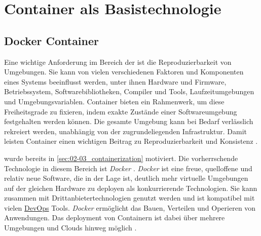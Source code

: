 \section{Container als Basistechnologie}
\label{sec:05-01_containers-as-base-technology}

\subsection{Docker Container}
\label{subsec:05-01-01_docker-container}

Eine wichtige Anforderung im Bereich der  ist die Reproduzierbarkeit von Umgebungen. Sie kann von vielen verschiedenen Faktoren und Komponenten eines Systems beeinflusst werden, unter ihnen Hardware und Firmware, Betriebssystem, Softwarebibliotheken, Compiler und Tools, Laufzeitumgebungen und Umgebungsvariablen. Container bieten ein Rahmenwerk, um diese Freiheitsgrade zu fixieren, indem exakte Zustände einer Softwareumgebung festgehalten werden können. Die gesamte Umgebung kann bei Bedarf verlässlich rekreiert werden, unabhängig von der zugrundeliegenden Infrastruktur. \cite{013:Role-of-Containers-in-Reproducibility} Damit leisten Container einen wichtigen Beitrag zu Reproduzierbarkeit und Konsistenz \cite{013:Role-of-Containers-in-Reproducibility,014:Managing-Container-based-Software-Development-Environments,023:Setting-up-CI-CD-Pipeline-in-the-Cloud-for-Web-Application,024:Investiugating-Impact-of-Containerization-on-Deployment-Process-in-DevOps}.

 wurde bereits in \autoref{sec:02-03_containerization} motiviert. Die vorherrschende Technologie in diesem Bereich ist \textit{Docker} \cite{015:Containers-in-Software-Development,021:Docker-Security-Threat-Model-and-Best-Practices}. \textit{Docker} ist eine freue, quelloffene und relativ neue Software, die in der Lage ist, deutlich mehr virtuelle Umgebungen auf der gleichen Hardware zu deployen als konkurrierende Technologien. Sie kann zusammen mit Drittanbietertechnologien genutzt werden und ist kompatibel mit vielen \hyperref[sec:03-01_introduction-to-devops]{DevOps} Tools. \textit{Docker} ermöglicht das Bauen, Verteilen und Operieren von Anwendungen. \cite{021:Docker-Security-Threat-Model-and-Best-Practices} Das \Gls{deployment} von Containern ist dabei über mehrere Umgebungen und Clouds hinweg möglich \cite{023:Setting-up-CI-CD-Pipeline-in-the-Cloud-for-Web-Application,024:Investiugating-Impact-of-Containerization-on-Deployment-Process-in-DevOps}.

